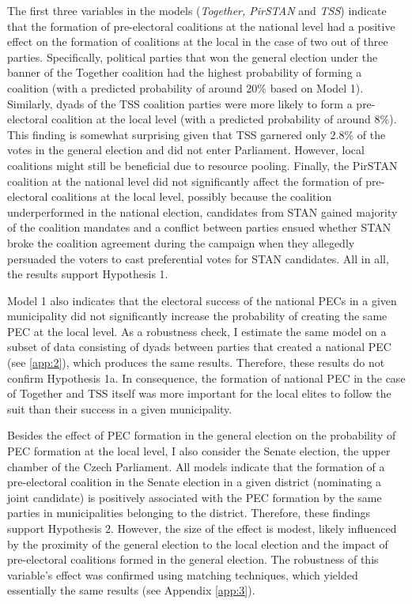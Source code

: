 \documentclass[]{interact}
\theoremstyle{plain}%
\theoremstyle{definition}
\theoremstyle{remark}
\begin{document}
The first three variables in the models (\emph{Together, PirSTAN} and \emph{TSS}) indicate that the formation of pre-electoral coalitions at the national level had a positive effect on the formation of coalitions at the local in the case of two out of three parties. Specifically, political parties that won the general election under the banner of the Together coalition had the highest probability of forming a coalition (with a predicted probability of around 20\% based on Model 1). Similarly, dyads of the TSS coalition parties were more likely to form a pre-electoral coalition at the local level (with a predicted probability of around 8\%). This finding is somewhat surprising given that TSS garnered only 2.8\% of the votes in the general election and did not enter Parliament. However, local coalitions might still be beneficial due to resource pooling. Finally, the PirSTAN coalition at the national level did not significantly affect the formation of pre-electoral coalitions at the local level, possibly because the coalition underperformed in the national election, candidates from STAN gained majority of the coalition mandates and a conflict between parties ensued whether STAN broke the coalition agreement during the campaign when they allegedly persuaded the voters to cast preferential votes for STAN candidates. All in all, the results support Hypothesis 1.

Model 1 also indicates that the electoral success of the national PECs in a given municipality did not significantly increase the probability of creating the same PEC at the local level. As a robustness check, I estimate the same model on a subset of data consisting of dyads between parties that created a national PEC (see \ref{app:2}), which produces the same results. Therefore, these results do not confirm Hypothesis 1a. In consequence, the formation of national PEC in the case of Together and TSS itself was more important for the local elites to follow the suit than their success in a given municipality. 

Besides the effect of PEC formation in the general election on the probability of PEC formation at the local level, I also consider the Senate election, the upper chamber of the Czech Parliament. All models indicate that the formation of a pre-electoral coalition in the Senate election in a given district (nominating a joint candidate) is positively associated with the PEC formation by the same parties in municipalities belonging to the district. Therefore, these findings support Hypothesis 2. However, the size of the effect is modest, likely influenced by the proximity of the general election to the local election and the impact of pre-electoral coalitions formed in the general election.
The robustness of this variable's effect was confirmed using matching techniques, which yielded essentially the same results (see Appendix \ref{app:3}).
\end{document}
